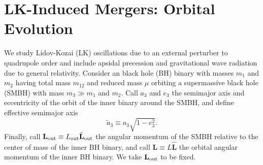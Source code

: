\documentclass[
        twocolumn,
        twocolappendix
    ]{aastex63}
\renewcommand*{\bm}[1]{\boldsymbol{\mathbf{#1}}}
\newcommand*{\uv}[1]{\hat{\bm{#1}}}
\begin{document}
\section{LK-Induced Mergers: Orbital Evolution}\label{s:setup}

We study Lidov-Kozai (LK) oscillations due to an external perturber to
quadrupole order and include apsidal precession and gravitational wave
radiation due to general relativity. Consider an black hole (BH) binary
with masses $m_1$ and $m_2$ having total mass $m_{12}$ and reduced mass $\mu$
orbiting a supermassive black hole (SMBH) with mass $m_3 \gg m_1$ and $m_2$.
Call $a_3$ and $e_3$ the semimajor axis and eccentricity of the orbit of the
inner binary around the SMBH, and define effective semimajor axis
\begin{equation}
    \tilde{a}_3 \equiv a_3\sqrt{1 - e_3^2}.
\end{equation}
Finally, call $\bm{L}_{\rm out} \equiv L_{\rm out} \uv{L}_{\rm out}$ the angular
momentum of the SMBH relative to the center of mass of the inner BH binary, and
call $\bm{L} \equiv L \uv{L}$ the orbital angular momentum of the inner BH
binary. We take $\bm{L}_{\rm out}$ to be fixed.
\end{document}
